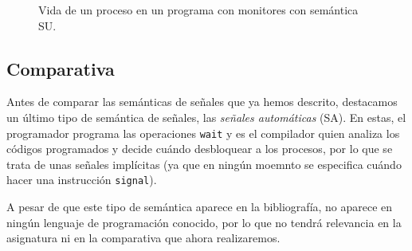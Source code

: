 \begin{figure}
\caption{Vida de un proceso en un programa con monitores con semántica SU.}
\label{fig:su}
\end{figure}

\subsection{Comparativa}\label{cap:comp}
Antes de comparar las semánticas de señales que ya hemos descrito, destacamos un último tipo de semántica de señales, las \textit{señales automáticas} (SA). En estas, el programador programa las operaciones \verb|wait| y es el compilador quien analiza los códigos programados y decide cuándo desbloquear a los procesos, por lo que se trata de unas señales implícitas (ya que en ningún moemnto se especifica cuándo hacer una instrucción \verb|signal|). 

A pesar de que este tipo de semántica aparece en la bibliografía, no aparece en ningún lenguaje de programación conocido, por lo que no tendrá relevancia en la asignatura ni en la comparativa que ahora realizaremos.\\

